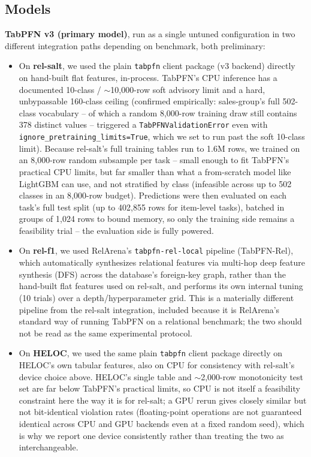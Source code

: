 \documentclass[11pt]{article}
\begin{document}
\subsection{Models}

\textbf{TabPFN v3 (primary model)}, run as a single untuned configuration in two different
integration paths depending on benchmark, both preliminary:

\begin{itemize}
\item On \textbf{rel-salt}, we used the plain \texttt{tabpfn} client package (v3 backend)
  directly on hand-built flat features, in-process. TabPFN's CPU inference has a documented
  10-class / $\sim$10{,}000-row soft advisory limit and a hard, unbypassable 160-class ceiling
  (confirmed empirically: sales-group's full 502-class vocabulary -- of which a random
  8{,}000-row training draw still contains 378 distinct values -- triggered a
  \texttt{TabPFNValidationError} even with \texttt{ignore\_pretraining\_limits=True}, which we
  set to run past the soft 10-class limit). Because rel-salt's full training tables run to
  1.6M rows, we trained on an 8{,}000-row random subsample per task -- small enough to fit
  TabPFN's practical CPU limits, but far smaller than what a from-scratch model like LightGBM
  can use, and not stratified by class (infeasible across up to 502 classes in an
  8{,}000-row budget). Predictions were then evaluated on each task's full test split (up to
  402{,}855 rows for item-level tasks), batched in groups of 1{,}024 rows to bound memory, so
  only the training side remains a feasibility trial -- the evaluation side is fully powered.
\item On \textbf{rel-f1}, we used RelArena's \texttt{tabpfn-rel-local} pipeline (TabPFN-Rel),
  which automatically synthesizes relational features via multi-hop deep feature synthesis
  (DFS) across the database's foreign-key graph, rather than the hand-built flat features used
  on rel-salt, and performs its own internal tuning (10 trials) over a depth/hyperparameter
  grid. This is a materially different pipeline from the rel-salt integration, included
  because it is RelArena's standard way of running TabPFN on a relational benchmark; the two
  should not be read as the same experimental protocol.
\item On \textbf{HELOC}, we used the same plain \texttt{tabpfn} client package directly on
  HELOC's own tabular features, also on CPU for consistency with rel-salt's device choice
  above. HELOC's single table and $\sim$2{,}000-row monotonicity test set are far below
  TabPFN's practical limits, so CPU is not itself a feasibility constraint here the way it is
  for rel-salt; a GPU rerun gives closely similar but not bit-identical violation rates
  (floating-point operations are not guaranteed identical across CPU and GPU backends even at
  a fixed random seed), which is why we report one device consistently rather than treating
  the two as interchangeable.
\end{itemize}
\end{document}
